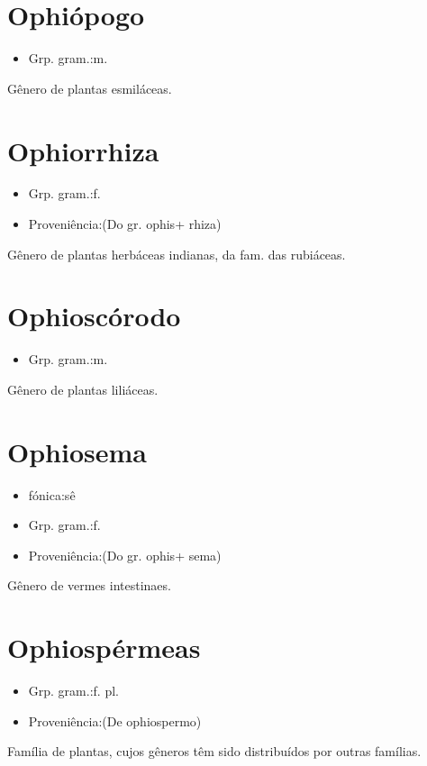 \section{Ophiópogo}
\begin{itemize}
\item {Grp. gram.:m.}
\end{itemize}
Gênero de plantas esmiláceas.
\section{Ophiorrhiza}
\begin{itemize}
\item {Grp. gram.:f.}
\end{itemize}
\begin{itemize}
\item {Proveniência:(Do gr. \textunderscore ophis\textunderscore  + \textunderscore rhiza\textunderscore )}
\end{itemize}
Gênero de plantas herbáceas indianas, da fam. das rubiáceas.
\section{Ophioscórodo}
\begin{itemize}
\item {Grp. gram.:m.}
\end{itemize}
Gênero de plantas liliáceas.
\section{Ophiosema}
\begin{itemize}
\item {fónica:sê}
\end{itemize}
\begin{itemize}
\item {Grp. gram.:f.}
\end{itemize}
\begin{itemize}
\item {Proveniência:(Do gr. \textunderscore ophis\textunderscore  + \textunderscore sema\textunderscore )}
\end{itemize}
Gênero de vermes intestinaes.
\section{Ophiospérmeas}
\begin{itemize}
\item {Grp. gram.:f. pl.}
\end{itemize}
\begin{itemize}
\item {Proveniência:(De \textunderscore ophiospermo\textunderscore )}
\end{itemize}
Família de plantas, cujos gêneros têm sido distribuídos por outras famílias.
